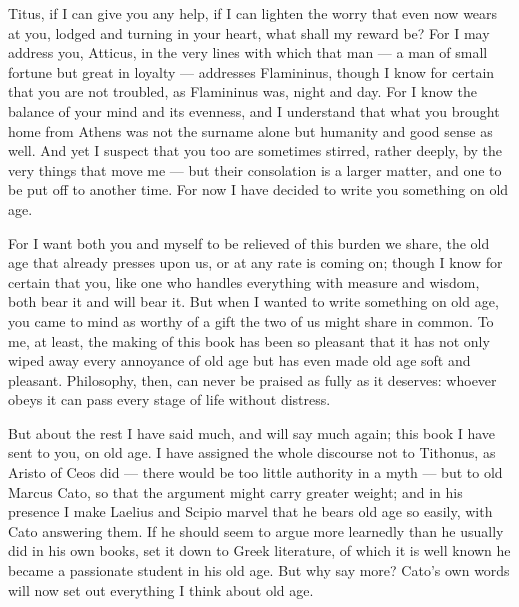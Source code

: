 
 Titus, if I can give you any help, if I can lighten the worry that even now wears at you, lodged and turning in your heart, what shall my reward be? For I may address you, Atticus, in the very lines with which that man — a man of small fortune but great in loyalty — addresses Flamininus, though I know for certain that you are not troubled, as Flamininus was, night and day. For I know the balance of your mind and its evenness, and I understand that what you brought home from Athens was not the surname alone but humanity and good sense as well. And yet I suspect that you too are sometimes stirred, rather deeply, by the very things that move me — but their consolation is a larger matter, and one to be put off to another time. For now I have decided to write you something on old age.

 For I want both you and myself to be relieved of this burden we share, the old age that already presses upon us, or at any rate is coming on; though I know for certain that you, like one who handles everything with measure and wisdom, both bear it and will bear it. But when I wanted to write something on old age, you came to mind as worthy of a gift the two of us might share in common. To me, at least, the making of this book has been so pleasant that it has not only wiped away every annoyance of old age but has even made old age soft and pleasant. Philosophy, then, can never be praised as fully as it deserves: whoever obeys it can pass every stage of life without distress.

 But about the rest I have said much, and will say much again; this book I have sent to you, on old age. I have assigned the whole discourse not to Tithonus, as Aristo of Ceos did — there would be too little authority in a myth — but to old Marcus Cato, so that the argument might carry greater weight; and in his presence I make Laelius and Scipio marvel that he bears old age so easily, with Cato answering them. If he should seem to argue more learnedly than he usually did in his own books, set it down to Greek literature, of which it is well known he became a passionate student in his old age. But why say more? Cato's own words will now set out everything I think about old age.

